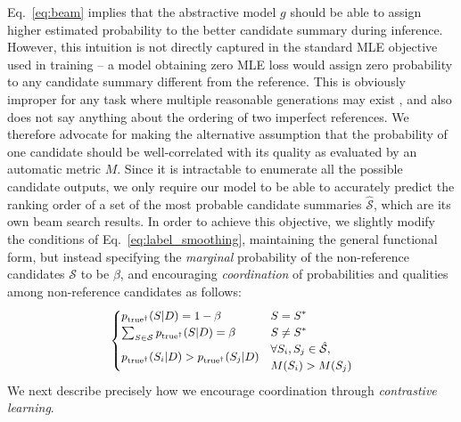 \documentclass[11pt]{article}
\begin{document}
Eq.~\ref{eq:beam} implies that the abstractive model $g$ should be able to assign higher estimated probability to the better candidate summary during inference.
However, this intuition is not directly captured in the standard MLE objective used in training -- a model obtaining zero MLE loss would assign zero probability to any candidate summary different from the reference.
This is obviously improper for any task where multiple reasonable generations may exist \citep{khayrallah-etal-2020-simulated}, and also does not say anything about the ordering of two imperfect references.
We therefore advocate for making the alternative assumption that the probability of one candidate should be well-correlated with its quality as evaluated by an automatic metric $M$.
Since it is intractable to enumerate all the possible candidate outputs, we only require our model to be able to accurately predict the ranking order of a set of the most probable candidate summaries $\hat{\mathcal{S}}$, which are its own beam search results.
In order to achieve this objective, we slightly modify the conditions of Eq.~\ref{eq:label_smoothing}, maintaining the general functional form, but instead specifying the \emph{marginal} probability of the non-reference candidates $\mathcal{S}$ to be $\beta$, and encouraging \emph{coordination} of probabilities and qualities among non-reference candidates as follows:
\begin{equation}
\small
 \begin{cases}
    p_{\mathrm{true}^\dag} (S|D) = 1 - \beta & S = S^* \\
    \sum_{S \in \mathcal{S}} p_{\mathrm{true}^\dag} (S|D) = \beta & S \neq S^* \\
   \multirow{2}{*}{$p_{\mathrm{true}^\dag} (S_i|D) > p_{\mathrm{true}^\dag} (S_j|D)$}  & \forall S_i, S_j \in \hat{\mathcal{S}}, \\
      & M(S_i) > M(S_j)  \\
\end{cases}
\label{eq:dist_ours}
\end{equation}
We next describe precisely how we encourage coordination through \emph{contrastive learning}.
\end{document}
